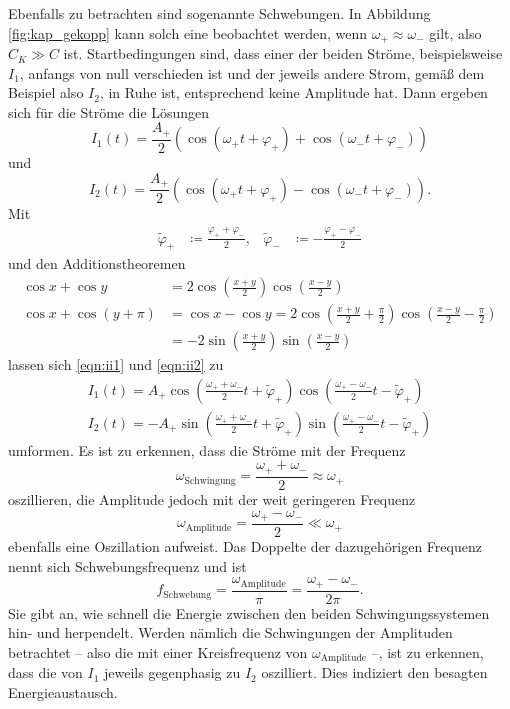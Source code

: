Ebenfalls zu betrachten sind sogenannte Schwebungen. 
In Abbildung \ref{fig:kap_gekopp} kann solch eine beobachtet werden, wenn ${\omega _+ \approx \omega _-}$ gilt, also 
${C_K \gg C}$ ist. 
Startbedingungen sind, dass einer der beiden Ströme, beispielsweise $I_1$, anfangs von null verschieden ist und der 
jeweils andere Strom, gemäß dem Beispiel also $I_2$, in Ruhe ist, entsprechend keine Amplitude hat. 
Dann ergeben sich für die Ströme die Lösungen 
\begin{equation}
    I_1 (t) = \frac{A_+}{2} ( \cos(\omega _+ t + \varphi _+) + \cos(\omega _- t + \varphi _-))
    \label{eqn:ii1}
\end{equation}
und 
\begin{equation}
    I_2 (t) = \frac{A_+}{2} ( \cos(\omega _+ t + \varphi _+) - \cos(\omega _- t + \varphi _-)) .
    \label{eqn:ii2}
\end{equation}
Mit 
\begin{align}
    \tilde{\varphi}_+ &\coloneq \frac{\varphi _+ + \varphi _-}{2} ,
    & \tilde{\varphi}_- &\coloneq - \frac{\varphi _+ - \varphi _-}{2}
\end{align}
und den Additionstheoremen 
\begin{align}
    \cos x + \cos y &= 2 \cos(\frac{x+y}{2}) \cos(\frac{x-y}{2}) \\
    \cos x + \cos(y + \pi) &= \cos x - \cos y = 2 \cos(\frac{x+y}{2} + \frac{\pi}{2}) \cos(\frac{x-y}{2} - \frac{\pi}{2}) \\
        &=-2  \sin(\frac{x+y}{2}) \sin(\frac{x-y}{2})
\end{align}
lassen sich \eqref{eqn:ii1} und \eqref{eqn:ii2} zu 
\begin{gather}
    I_1 (t)= A_+ \cos(\frac{\omega _+ + \omega _-}{2}t +\tilde{\varphi}_+) \cos(\frac{\omega _+ - \omega _-}{2}t -\tilde{\varphi}_+) \\
    I_2 (t)=-A_+ \sin(\frac{\omega _+ + \omega _-}{2}t +\tilde{\varphi}_+) \sin(\frac{\omega _+ - \omega _-}{2}t -\tilde{\varphi}_+)
\end{gather}
umformen.
Es ist zu erkennen, dass die Ströme mit der Frequenz 
\begin{equation}
    \omega _\text{Schwingung} = \frac{\omega _+ + \omega _-}{2} \approx \omega _+
\end{equation}
oszillieren, die Amplitude jedoch mit der weit geringeren Frequenz 
\begin{equation}
    \omega _\text{Amplitude} = \frac{\omega _+ - \omega _-}{2} \ll \omega _+
\end{equation} 
ebenfalls eine Oszillation aufweist. 
Das Doppelte der dazugehörigen Frequenz nennt sich Schwebungsfrequenz und ist 
\begin{equation}
    f_\text{Schwebung}= \frac{\omega _\text{Amplitude}}{\pi}=\frac{\omega _+ - \omega _-}{2 \pi}.
    \label{eqn:fschwebung}
\end{equation} 
Sie gibt an, wie schnell die Energie zwischen den beiden Schwingungssystemen hin- und herpendelt. 
Werden nämlich die Schwingungen der Amplituden betrachtet -- also die mit einer Kreisfrequenz von $\omega _\text{Amplitude}$ --, 
ist zu erkennen, dass die von $I_1$ jeweils gegenphasig zu $I_2$ oszilliert. 
Dies indiziert den besagten Energieaustausch. 
\FloatBarrier

